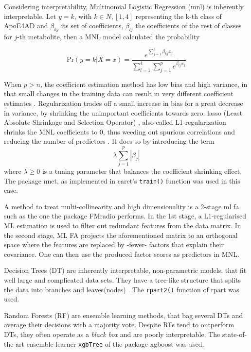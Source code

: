 \documentclass{amsart}
\theoremstyle{plain}
\begin{document}
Considering interpretability, Multinomial Logistic Regression (\acrshort{mnl}) is inherently interpretable. Let $y = k$, with $k \in N, [1,4]$ representing the k-th class of ApoE4AD and $\beta_{kj}$ its set of coefficients,  $\beta_{lj}$ the coefficients of the rest of classes for $j$-th metabolite, then a MNL model calculated the probability

\[\textrm{Pr}(y=k|X=x) =  \dfrac{e^{\sum_{j=1}^{p}\beta_{kj}x_j}}{\sum_{l=1}^{4}\sum_{j=1}^{p}e^{\beta_{lj}x_j}}\]

When $p > n$, the coefficient estimation method has low bias and high variance, in that small changes in the training data can result in very different coefficient estimates \cite{James2023AnEdition}. Regularization trades off a small increase in bias for a great decrease in variance, by shrinking the unimportant coefficients towards zero. \acrshort{lasso} (Least Absolute Shrinkage and Selection Operator) \cite{Tibshiranit1996RegressionLasso}, also called L1-regularization shrinks the MNL coefficients to 0, thus weeding out spurious correlations and reducing the number of predictors \cite{Tibshiranit1996RegressionLasso}. It does so by introducing the term  \[\lambda\sum_{j=1}^{p}|\beta_j|\] where $\lambda \geq 0$ is a tuning parameter that balances the coefficient shrinking effect. The package \textsf{nnet}, as implemented in \textsf{caret}'s \texttt{train()} function was used in this case.

A method to treat multi-collinearity and high dimensionality is a 2-stage \acrfull{ml} \acrfull{fa}, such as the one the package \textsf{FMradio} \cite{Peeters2019StableData} performs. In the 1st stage, a L1-regularised ML estimation is used to filter out redundant features from the data matrix. In the second stage, ML FA projects the aforementioned matrix to an orthogonal space where the features are replaced by -fewer- factors that explain their covariance. One can then use the produced factor scores as predictors in MNL.

Decision Trees (DT) are inherently interpretable, non-parametric models, that fit well large and complicated data sets. They have a tree-like structure that splits the data into branches and leaves(nodes) \cite{Song2015DecisionPrediction}. The \texttt{rpart2()} \cite{rpart} function of \textsf{rpart} was used.

Random Forests (RF) are ensemble learning methods, that bag several DTs and average their decisions with a majority vote. Despite RFs tend to outperform DTs, they often operate as a \textit{black box} and are poorly interpretable. The state-of-the-art ensemble learner \texttt{xgbTree} of the package \textsf{xgboost} \cite{Chen2016XGBoost:System} was used.
\end{document}
